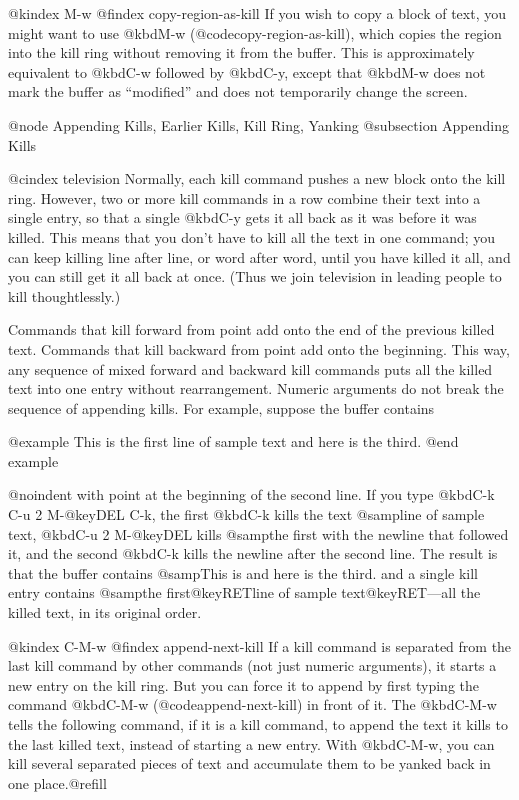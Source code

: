 {{{{{{{{@kindex M-w
@findex copy-region-as-kill
  If you wish to copy a block of text, you might want to use @kbd{M-w}
(@code{copy-region-as-kill}), which copies the region into the kill ring
without removing it from the buffer.  This is approximately equivalent to
@kbd{C-w} followed by @kbd{C-y}, except that @kbd{M-w} does not mark the
buffer as ``modified'' and does not temporarily change the screen.

@node Appending Kills, Earlier Kills, Kill Ring, Yanking
@subsection Appending Kills

@cindex television
  Normally, each kill command pushes a new block onto the kill ring.
However, two or more kill commands in a row combine their text into a
single entry, so that a single @kbd{C-y} gets it all back as it was before
it was killed.  This means that you don't have to kill all the text in one
command; you can keep killing line after line, or word after word, until
you have killed it all, and you can still get it all back at once.  (Thus
we join television in leading people to kill thoughtlessly.)

  Commands that kill forward from point add onto the end of the previous
killed text.  Commands that kill backward from point add onto the
beginning.  This way, any sequence of mixed forward and backward kill
commands puts all the killed text into one entry without rearrangement.
Numeric arguments do not break the sequence of appending kills.  For
example, suppose the buffer contains

@example
This is the first
line of sample text
and here is the third.
@end example

@noindent
with point at the beginning of the second line.  If you type @kbd{C-k C-u 2
M-@key{DEL} C-k}, the first @kbd{C-k} kills the text @samp{line of sample
text}, @kbd{C-u 2 M-@key{DEL}} kills @samp{the first} with the newline that
followed it, and the second @kbd{C-k} kills the newline after the second
line.  The result is that the buffer contains @samp{This is and here is the
third.} and a single kill entry contains @samp{the first@key{RET}line of
sample text@key{RET}}---all the killed text, in its original order.

@kindex C-M-w
@findex append-next-kill
  If a kill command is separated from the last kill command by other
commands (not just numeric arguments), it starts a new entry on the kill
ring.  But you can force it to append by first typing the command
@kbd{C-M-w} (@code{append-next-kill}) in front of it.  The @kbd{C-M-w}
tells the following command, if it is a kill command, to append the text it
kills to the last killed text, instead of starting a new entry.  With
@kbd{C-M-w}, you can kill several separated pieces of text and accumulate
them to be yanked back in one place.@refill

}}}}}}}}
